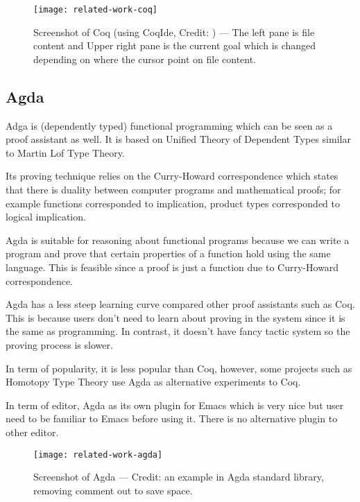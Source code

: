 \documentclass[master.tex]{subfiles}
\begin{document}
\begin{figure}[H]
    \centering
    \texttt{[image: related-work-coq]}
    \caption{Screenshot of Coq (using CoqIde, Credit:
      \cite{coq-official-website}) --- The left pane is file content and Upper
      right pane is the current goal which is changed depending on where the
      cursor point on file content.}
\label{fig:related-work-coq}
\end{figure}

\subsection{Agda}
Adga\supercite{agda-official-website} is (dependently typed) functional
programming which can be seen as a proof assistant as well. It is based on
Unified Theory of Dependent
Types\supercite{norell:thesis}\supercite{Luo:1994:CRT:184757} similar to Martin
Lof Type Theory.

Its proving technique relies on the Curry-Howard correspondence which states
that there is duality between computer programs and mathematical
proofs\supercite{curry-howard-correspondence}; for example functions
corresponded to implication, product types corresponded to logical implication.

Agda is suitable for reasoning about functional programs because we can write a
program and prove that certain properties of a function hold using the same
language. This is feasible since a proof is just a function due to Curry-Howard
correspondence.

Agda has a less steep learning curve compared other proof assistants such as
Coq. This is because users don't need to learn about proving in the system since
it is the same as programming. In contrast, it doesn't have fancy tactic system
so the proving process is slower.

In term of popularity, it is less popular than Coq, however, some projects such
as Homotopy Type Theory\supercite{hott-coq-repo}\supercite{hott-agda-repo} use
Agda as alternative experiments to Coq.

In term of editor, Agda as its own plugin for Emacs which is very nice but user
need to be familiar to Emacs before using it. There is no alternative plugin to
other editor.

\begin{figure}[H]
    \centering
    \texttt{[image: related-work-agda]}
    \caption{Screenshot of Agda --- Credit: an example in Agda standard library,
    removing comment out to save space.}
\label{fig:related-work-agda}
\end{figure}
\end{document}
